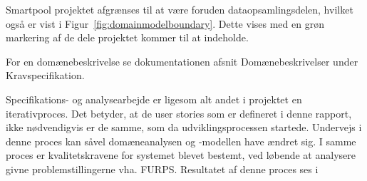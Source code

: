Smartpool projektet afgrænses til at være foruden dataopsamlingsdelen, hvilket også er vist i Figur~\ref{fig:domainmodelboundary}. Dette vises med en grøn markering af de dele projektet kommer til at indeholde.

For en domænebeskrivelse se dokumentationen afsnit Domænebeskrivelser under Kravspecifikation.

Specifikations- og analysearbejde er ligesom alt andet i projektet en iterativproces. Det betyder, at de user stories som er defineret i denne rapport, ikke nødvendigvis er de samme, som da udviklingsprocessen startede. Undervejs i denne proces kan såvel domæneanalysen og -modellen have ændret sig. I samme proces er kvalitetskravene for systemet blevet bestemt, ved løbende at analysere givne problemstillingerne vha. FURPS. Resultatet af denne proces ses i  